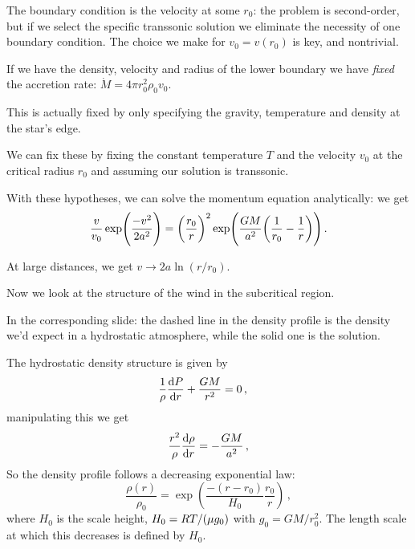 \documentclass[main.tex]{subfiles}
\begin{document}
The boundary condition is the velocity at some \(r_0 \): the problem is second-order, but if we select the specific transsonic solution we eliminate the necessity of one boundary condition.
The choice we make for \(v_0  = v(r_0)\) is key, and nontrivial.

If we have the density, velocity and radius of the lower boundary we have \emph{fixed} the accretion rate: \(\dot{M}  = 4 \pi r_0^2 \rho_0 v_0 \). 

This is actually fixed by only specifying the gravity, temperature and density at the star's edge. 

We can fix these by fixing the constant temperature \(T\) and the velocity \(v_0 \) at the critical radius \(r_0\) and assuming our solution is transsonic.


With these hypotheses, we can solve the momentum equation analytically: we get 
%
\begin{equation}
  \frac{v}{v_0 } \exp( \frac{-v^2}{2 a^2}) = \qty(\frac{r_0}{r})^2 \exp(\frac{GM}{a^2} \qty(\frac{1}{r_0 } - \frac{1}{r}))  
\,.
\end{equation}
%

At large distances, we get \(v \rightarrow 2 a \ln(r/r_0)\).

Now we look at the structure of the wind in the subcritical region.

In the corresponding slide: the dashed line in the density profile is the density we'd expect in a hydrostatic atmosphere, while the solid one is the solution.

The hydrostatic density structure is given by 
%
\begin{subequations}
\begin{align}
  \frac{1}{\rho } \dv{P}{r}  +\frac{GM }{r^2}  &= 0 
\,,
\end{align}
\end{subequations}
%
manipulating this we get 
%
\begin{equation}
  \frac{r^2}{\rho } \dv{\rho }{r} = - \frac{GM}{a^2}
\,,
\end{equation}
%
So the density profile follows a decreasing exponential law: 
%
\begin{equation}
  \frac{\rho (r)}{\rho_0 } = \exp(\frac{-(r-r_0 )}{H_0 } \frac{r_0}{r} ) 
\,,
\end{equation}
%
where \(H_0 \) is the scale height, \(H_0 = RT / \qty(\mu g_0 )\) with \(g_0 = GM / r_0^2\).
The length scale at which this decreases is defined by \(H_0 \). 
\end{document}
